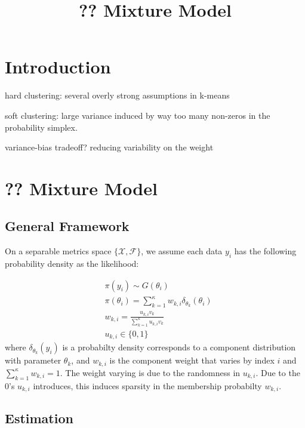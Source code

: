 \documentclass[12pt]{article}
\title
    {?? Mixture Model}
\date{}
\begin{document}
    
\maketitle

\section{Introduction}

hard clustering:
several overly strong assumptions in k-means

soft clustering:
large variance induced by way too many non-zeros in the probability simplex.

variance-bias tradeoff?
reducing variability on the weight

\section{?? Mixture Model}

\subsection{General Framework}

On a separable metrics space $\{\mathcal{X},\mathcal{F}\}$, we assume each data $y_i$ has the following probability density as the likelihood:

\begin{equation}
\begin{aligned}
& \pi(y_i) \sim G(\theta_i) \\
& \pi(\theta_i) = \sum_{k=1}^{\kappa} w_{k,i} \delta_{\theta_{k}}(\theta_i) \\
& w_{k,i} = \frac{ u_{k,i} v_{k} } { \sum_{k=1}^{\kappa}  u_{k,i} v_{k} }\\
& u_{k,i} \in \{0,1\}
\end{aligned}
\label{marginal_lik}
\end{equation}
where $\delta_{\theta_{k}}(y_i)$ is a probabilty density corresponds to a component distribution with parameter $\theta_{k}$, and $w_{k,i}$ is the component weight that varies by index $i$ and $\sum_{k=1}^{\kappa} w_{k,i} =1$. The weight varying is due to the randomness in $u_{k,i}$. Due to the $0$'s $u_{k,i}$ introduces, this induces sparsity in the membership probabilty $w_{k,i}$.

\subsection{Estimation}
\end{document}
